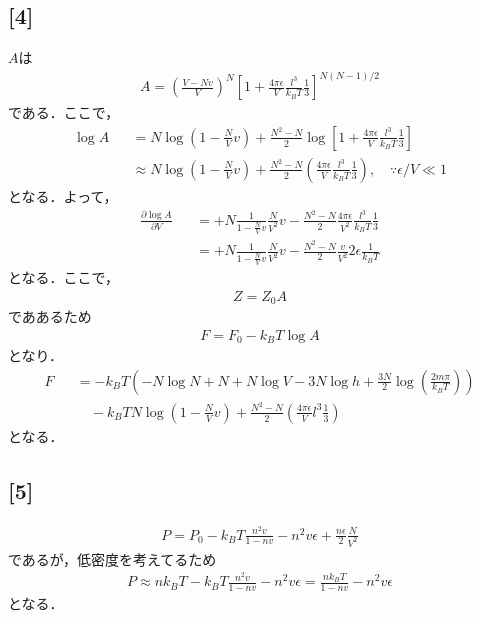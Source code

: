 \documentclass[12pt,dvipdfmx]{jsarticle}
\begin{document}
\subsection*{\large{[4]}}
$A$は
\begin{eqnarray}
  A = \left( \frac{V-Nv}{V} \right)^N \left[ 1+\frac{4\pi\epsilon}{V}\frac{l^3}{k_B T}\frac{1}{3}\right]^{N(N-1)/2}
\end{eqnarray}
である．ここで，
\begin{eqnarray}
  \log A &&= N \log \left( 1- \frac{N}{V}v \right) + \frac{N^2-N}{2}\log \left[ 1+\frac{4\pi\epsilon}{V}\frac{l^3}{k_B T}\frac{1}{3}\right]\\
  &&\approx N \log \left( 1- \frac{N}{V}v \right) + \frac{N^2-N}{2} \left( \frac{4\pi\epsilon}{V}\frac{l^3}{k_B T}\frac{1}{3} \right), \quad\because \epsilon/V \ll 1
\end{eqnarray}
となる．よって，
\begin{eqnarray}
  \frac{\partial \log A}{\partial V} &&= +N \frac{1}{1-\frac{N}{V}v}\frac{N}{V^2}v -\frac{N^2-N}{2}\frac{4\pi\epsilon}{V^2}\frac{l^3}{k_B T}\frac{1}{3}\\
  &&= +N \frac{1}{1-\frac{N}{V}v}\frac{N}{V^2}v -\frac{N^2-N}{2}\frac{v}{V^2}2\epsilon\frac{1}{k_BT}
\end{eqnarray}
となる．ここで，
\begin{eqnarray}
  Z = Z_0 A
\end{eqnarray}
でああるため
\begin{eqnarray}
  F = F_0 -k_BT \log A
\end{eqnarray}
となり．
\begin{eqnarray}
  F &&= -k_BT \left( -N\log N +N + N\log V -3N\log h + \frac{3N}{2}\log\left( \frac{2m\pi}{k_B T} \right) \right)\\
  &&\quad -k_BT N \log \left( 1- \frac{N}{V}v \right) + \frac{N^2-N}{2} \left( \frac{4\pi\epsilon}{V}l^3\frac{1}{3} \right)
\end{eqnarray}
となる．
\subsection*{\large{[5]}}

\begin{eqnarray}
  P = P_0 - k_BT \frac{n^2 v}{1-nv} - n^2 v\epsilon + \frac{n\epsilon}{2}\frac{N}{V^2}
\end{eqnarray}
であるが，低密度を考えてるため
\begin{eqnarray}
  P \approx nk_B T - k_BT \frac{n^2 v}{1-nv} - n^2 v\epsilon = \frac{nk_BT}{1-nv} -n^2 v\epsilon
\end{eqnarray}
となる．
\end{document}
